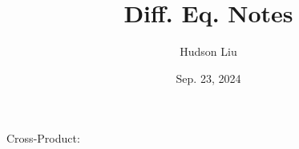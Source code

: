 \documentclass{article}
\title{Diff. Eq. Notes}
\author{Hudson Liu}
\date{Sep. 23, 2024}
\begin{document}
\maketitle
Cross-Product:
\end{document}
